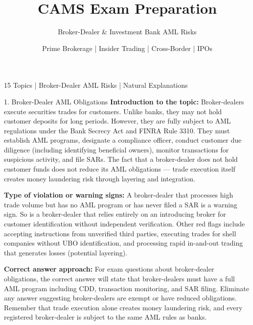 \documentclass[11pt,a4paper]{beamer}
\title[CAMS Exam Preparation]{CAMS Exam Preparation}
\subtitle{Broker-Dealer \& Investment Bank AML Risks}
\author{Prime Brokerage | Insider Trading | Cross-Border | IPOs}
\date{}
\begin{document}
\begin{frame}
\titlepage
\centering
\tiny 15 Topics | Broker-Dealer AML Risks | Natural Explanations
\end{frame}

\begin{frame}{1. Broker-Dealer AML Obligations}
\tiny
\noindent\textbf{Introduction to the topic:} Broker-dealers execute securities trades for customers. Unlike banks, they may not hold customer deposits for long periods. However, they are fully subject to AML regulations under the Bank Secrecy Act and FINRA Rule 3310. They must establish AML programs, designate a compliance officer, conduct customer due diligence (including identifying beneficial owners), monitor transactions for suspicious activity, and file SARs. The fact that a broker-dealer does not hold customer funds does not reduce its AML obligations — trade execution itself creates money laundering risk through layering and integration.

\vspace{0.1cm}
\noindent\textbf{Type of violation or warning signs:} A broker-dealer that processes high trade volume but has no AML program or has never filed a SAR is a warning sign. So is a broker-dealer that relies entirely on an introducing broker for customer identification without independent verification. Other red flags include accepting instructions from unverified third parties, executing trades for shell companies without UBO identification, and processing rapid in-and-out trading that generates losses (potential layering).

\vspace{0.1cm}
\noindent\textbf{Correct answer approach:} For exam questions about broker-dealer obligations, the correct answer will state that broker-dealers must have a full AML program including CDD, transaction monitoring, and SAR filing. Eliminate any answer suggesting broker-dealers are exempt or have reduced obligations. Remember that trade execution alone creates money laundering risk, and every registered broker-dealer is subject to the same AML rules as banks.
\end{frame}
\end{document}
